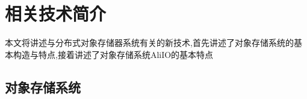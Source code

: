 
\chapter{相关技术简介}
本文将讲述与分布式对象存储器系统有关的新技术,首先讲述了对象存储系统的基本构造与特点,接着讲述了对象存储系统AliIO的基本特点

\section{对象存储系统}


 













